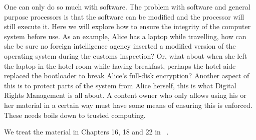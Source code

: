 One can only do so much with software.
The problem with software and general purpose processors is that the software 
can be modified and the processor will still execute it.
Here we will explore how to ensure the integrity of the computer system before 
use.
As an example, Alice has a laptop while travelling, how can she be sure no 
foreign intelligence agency inserted a modified version of the operating system 
during the customs inspection?
Or, what about when she left the laptop in the hotel room while having 
breakfast, perhaps the hotel aide replaced the bootloader to break Alice's 
full-disk encryption?
Another aspect of this is to protect parts of the system from Alice herself, 
this is what Digital Rights Management is all about.
A content owner who only allows using his or her material in a certain way must 
have some means of ensuring this is enforced.
These needs boils down to trusted computing.

We treat the material in Chapters 16, 18 and 22 in 
~\cite{Anderson2008sea}.
